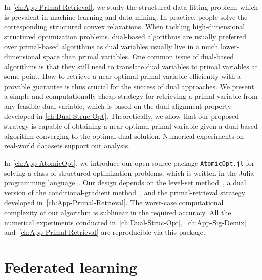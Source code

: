 In \autoref{ch:App-Primal-Retrieval}, we study the structured data-fitting problem, which is prevalent in machine learning and data mining. In practice, people solve the corresponding structured convex relaxations. When tackling high-dimensional structured optimization problems, dual-based algorithms are usually preferred over primal-based algorithms as dual variables usually live in a much lower-dimensional space than primal variables. One common issue of dual-based algorithms is that they still need to translate dual variables to primal variables at some point. How to retrieve a near-optimal primal variable efficiently with a provable guarantee is thus crucial for the success of dual approaches. We present a simple and computationally cheap strategy for retrieving a primal variable from any feasible dual variable, which is based on the dual alignment property developed in \autoref{ch:Dual-Struc-Opt}. Theoretically, we show that our proposed strategy is capable of obtaining a near-optimal primal variable given a dual-based algorithm converging to the optimal dual solution. Numerical experiments on real-world datasets support our analysis.

In \autoref{ch:App-AtomicOpt}, we introduce our open-source package \texttt{AtomicOpt.jl} for solving a class of structured optimization problems, which is written in the Julia programming language~\citep{bezanson2017julia}. Our design depends on the level-set method~\citep{aravkin2016levelset}, a dual version of the conditional-gradient method~\cite{jaggi2013revisiting,frank1956algorithm,dunn1978conditional}, and the primal-retrieval strategy developed in~\autoref{ch:App-Primal-Retrieval}. The worst-case computational complexity of our algorithm is sublinear in the required accuracy. All the numerical experiments conducted in~\autoref{ch:Dual-Struc-Opt},~\autoref{ch:App-Sig-Demix} and~\autoref{ch:App-Primal-Retrieval} are reproducible via this package. 



 

\section{Federated learning} \label{sec:1-4}

